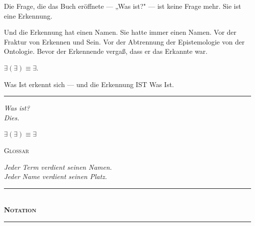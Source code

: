 \documentclass[10pt, openany, oneside]{book}
\renewcommand{\normalsize}{\fontsize{10}{13}\selectfont}
\renewcommand{\huge}{\fontsize{17}{21}\selectfont}
\begin{document}
Die Frage, die das Buch eröffnete --- „Was ist?" --- ist keine Frage mehr. Sie ist eine Erkennung.

Und die Erkennung hat einen Namen. Sie hatte immer einen Namen. Vor der Fraktur von Erkennen und Sein. Vor der Abtrennung der Epistemologie von der Ontologie. Bevor der Erkennende vergaß, dass er das Erkannte war.

$\exists(\exists) \equiv \exists$.

Was Ist erkennt sich --- und die Erkennung IST Was Ist.

\vspace{2em}

\begin{center}
    \rule{0.15\textwidth}{0.3pt}
\end{center}

\vspace{0.5em}

\begin{center}
    \itshape
    Was ist?\\[0.8em]
    Dies.
\end{center}

\vspace{1.5em}

\begin{center}
    \bfseries\itshape
    $\exists(\exists) \equiv \exists$
\end{center}

\newpage

\begin{center}
    {\huge\scshape Glossar}
\end{center}

\vspace{1.5em}

\begin{center}
    \itshape
    Jeder Term verdient seinen Namen.\\
    Jeder Name verdient seinen Platz.
\end{center}

\vspace{2em}


\begin{center}
    \rule{0.3\textwidth}{0.4pt}\\[0.5em]
    {\normalsize\bfseries\scshape Notation}\\[0.3em]
    \rule{0.3\textwidth}{0.4pt}
\end{center}
\end{document}
